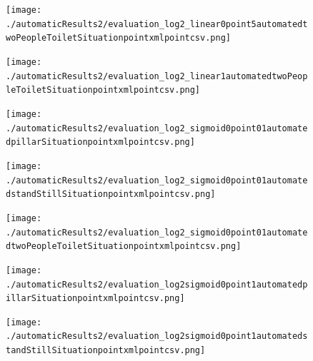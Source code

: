 \documentclass[11pt]{book}
\begin{document}
\begin{figure}
\centering
\texttt{[image: ./automaticResults2/evaluation\_log2\_linear0point5automatedtwoPeopleToiletSituationpointxmlpointcsv.png]}
\label{evaluation_log2_linear0point5automatedtwoPeopleToiletSituationpointxmlpointcsv}
\end{figure}

\begin{figure}
\centering
\texttt{[image: ./automaticResults2/evaluation\_log2\_linear1automatedtwoPeopleToiletSituationpointxmlpointcsv.png]}
\label{evaluation_log2_linear1automatedtwoPeopleToiletSituationpointxmlpointcsv}
\end{figure}

\begin{figure}
\centering
\texttt{[image: ./automaticResults2/evaluation\_log2\_sigmoid0point01automatedpillarSituationpointxmlpointcsv.png]}
\label{evaluation_log2_sigmoid0point01automatedpillarSituationpointxmlpointcsv}
\end{figure}

\begin{figure}
\centering
\texttt{[image: ./automaticResults2/evaluation\_log2\_sigmoid0point01automatedstandStillSituationpointxmlpointcsv.png]}
\label{evaluation_log2_sigmoid0point01automatedstandStillSituationpointxmlpointcsv}
\end{figure}

\begin{figure}
\centering
\texttt{[image: ./automaticResults2/evaluation\_log2\_sigmoid0point01automatedtwoPeopleToiletSituationpointxmlpointcsv.png]}
\label{evaluation_log2_sigmoid0point01automatedtwoPeopleToiletSituationpointxmlpointcsv}
\end{figure}

\begin{figure}
\centering
\texttt{[image: ./automaticResults2/evaluation\_log2sigmoid0point1automatedpillarSituationpointxmlpointcsv.png]}
\label{evaluation_log2sigmoid0point1automatedpillarSituationpointxmlpointcsv}
\end{figure}

\begin{figure}
\centering
\texttt{[image: ./automaticResults2/evaluation\_log2sigmoid0point1automatedstandStillSituationpointxmlpointcsv.png]}
\label{evaluation_log2sigmoid0point1automatedstandStillSituationpointxmlpointcsv}
\end{figure}
\clearpage
\end{document}
